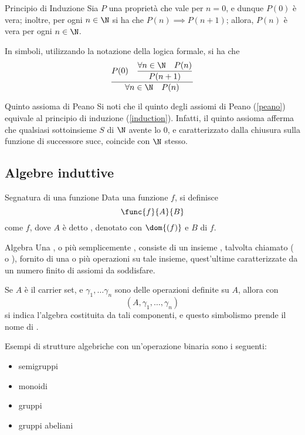 \documentclass[a4paper, 12pt]{report}
\begin{document}
    \begin{framedprinc}[label={induction}]{Principio di Induzione}
        Sia $P$ una proprietà che vale per $n = 0$, e dunque $P(0)$ è vera; inoltre,  per ogni $n \in \N$ si ha che $P(n) \implies P(n + 1)$; allora, $P(n)$ è vera per ogni $n \in \N$.

        In simboli, utilizzando la notazione della logica formale, si ha che $$\dfrac{P(0) \quad \dfrac{\forall n \in \N \quad P(n)}{P(n + 1)}}{\forall n \in \N \quad P(n)}$$
    \end{framedprinc}

    \begin{framedobs}{Quinto assioma di Peano}
        Si noti che il quinto degli assiomi di Peano (\cref{peano}) equivale al principio di induzione (\cref{induction}). Infatti, il quinto assioma afferma che qualsiasi sottoinsieme $S$ di $\N$ avente lo 0, e caratterizzato dalla chiusura sulla funzione di successore $\mathrm{succ}$, coincide con $\N$ stesso.
    \end{framedobs}

    \subsection{Algebre induttive}

    \begin{frameddefn}{Segnatura di una funzione}
        Data una funzione $f$, si definisce $$\func{f}{A}{B}$$ come  $f$, dove $A$ è detto , denotato con $\dom{(f)}$ e $B$  di $f$.
    \end{frameddefn}

    \begin{frameddefn}{Algebra}
        Una , o più semplicemente , consiste di un insieme , talvolta chiamato  ( o ), fornito di una o più operazioni su tale insieme, quest'ultime caratterizzate da un numero finito di assiomi da soddisfare.

        Se $A$ è il carrier set, e $\gamma_1, \ldots \gamma_n$ sono delle operazioni definite su $A$, allora con $$(A, \gamma_1, \ldots, \gamma_n)$$ si indica l'algebra costituita da tali componenti, e questo simbolismo prende il nome di .
    \end{frameddefn}

    \begin{example}
        Esempi di strutture algebriche con un'operazione binaria sono i seguenti:

        \begin{itemize}
            \item semigruppi
            \item monoidi
            \item gruppi
            \item gruppi abeliani
        \end{itemize}
    \end{example}
\end{document}
